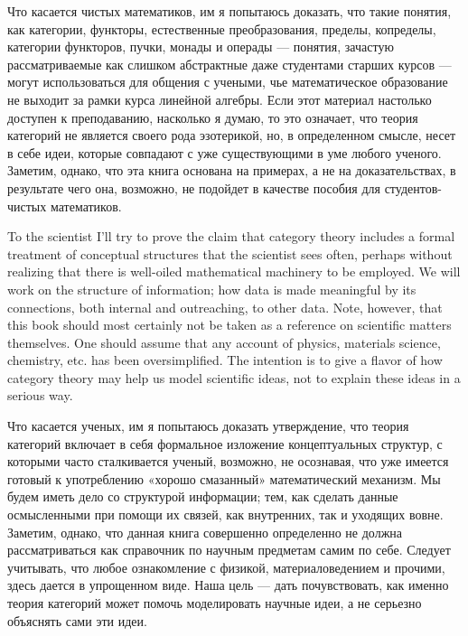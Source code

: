 \documentclass[CT4S-EN-RU]{subfiles}
\begin{document}
\begin{blockRUS}
Что касается чистых математиков, им я попытаюсь доказать, что такие понятия, как категории, функторы, естественные преобразования, пределы, копределы, категории функторов, пучки, монады и операды — понятия, зачастую рассматриваемые как слишком абстрактные даже студентами старших курсов — могут использоваться для общения с учеными, чье математическое образование не выходит за рамки курса линейной алгебры. Если этот материал настолько доступен к преподаванию, насколько я думаю, то это означает, что теория категорий не является своего рода эзотерикой, но, в определенном смысле, несет в себе идеи, которые совпадают с уже существующими в уме любого ученого. Заметим, однако, что эта книга основана на примерах, а не на доказательствах, в результате чего она, возможно, не подойдет в качестве пособия для студентов-чистых математиков. 
\end{blockRUS}

\begin{blockENG}
To the scientist I'll try to prove the claim that category theory includes a formal treatment of conceptual structures that the scientist sees often, perhaps without realizing that there is well-oiled mathematical machinery to be employed. We will work on the structure of information; how data is made meaningful by its connections, both internal and outreaching, to other data. Note, however, that this book should most certainly not be taken as a reference on scientific matters themselves. One should assume that any account of physics, materials science, chemistry, etc. has been oversimplified. The intention is to give a flavor of how category theory may help us model scientific ideas, not to explain these ideas in a serious way.
\end{blockENG}

\begin{blockRUS}
Что касается ученых, им я попытаюсь доказать утверждение, что теория категорий включает в себя формальное изложение концептуальных структур, с которыми часто сталкивается ученый, возможно, не осознавая, что уже имеется готовый к употреблению «хорошо смазанный» математический механизм. Мы будем иметь дело со структурой информации; тем, как сделать данные осмысленными при помощи их связей, как внутренних, так и уходящих вовне. Заметим, однако, что данная книга совершенно определенно не должна рассматриваться как справочник по научным предметам самим по себе. Следует учитывать, что любое ознакомление с физикой, материаловедением и прочими, здесь дается в упрощенном виде. Наша цель — дать почувствовать, как именно теория категорий может помочь моделировать научные идеи, а не серьезно объяснять сами эти идеи. 
\end{blockRUS}
\end{document}
